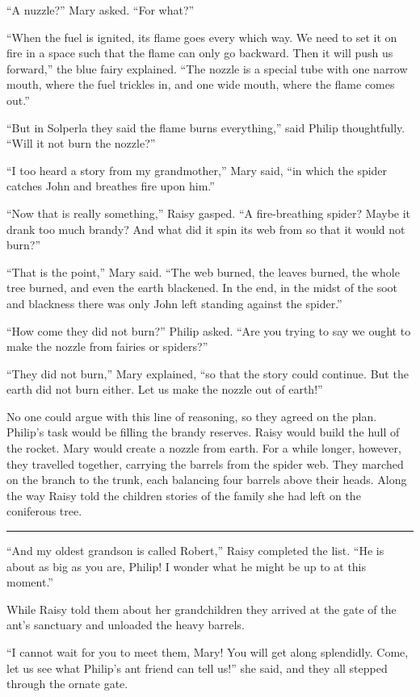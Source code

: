 \documentclass[10pt]{memoir}
\renewcommand{\pfbreakdisplay}{\bigskip \ding{166} \bigskip}
\newcommand{\secbreak}{\fancybreak{\pfbreakdisplay}}
\begin{document}
``A nuzzle?'' Mary asked. ``For what?''

``When the fuel is ignited, its flame goes every which way. We need to set it
on fire in a space such that the flame can only go backward. Then it will push
us forward,'' the blue fairy explained. ``The nozzle is a special tube with one
narrow mouth, where the fuel trickles in, and one wide mouth, where the flame
comes out.''

``But in Solperla they said the flame burns everything,'' said Philip
thoughtfully. ``Will it not burn the nozzle?''

``I too heard a story from my grandmother,'' Mary said, ``in which the spider
catches John and breathes fire upon him.''

``Now that is really something,'' Raisy gasped. ``A fire-breathing spider?
Maybe it drank too much brandy? And what did it spin its web from so that it
would not burn?''

``That is the point,'' Mary said. ``The web burned, the leaves burned, the
whole tree burned, and even the earth blackened. In the end, in the midst of
the soot and blackness there was only John left standing against the spider.''

``How come they did not burn?'' Philip asked. ``Are you trying to say we ought
to make the nozzle from fairies or spiders?''

``They did not burn,'' Mary explained, ``so that the story could continue. But
the earth did not burn either. Let us make the nozzle out of earth!''

No one could argue with this line of reasoning, so they agreed on the plan.
Philip's task would be filling the brandy reserves. Raisy would build the hull
of the rocket. Mary would create a nozzle from earth. For a while longer,
however, they travelled together, carrying the barrels from the spider web.
They marched on the branch to the trunk, each balancing four barrels above
their heads. Along the way Raisy told the children stories of the family she
had left on the coniferous tree.

\secbreak

``And my oldest grandson is called Robert,'' Raisy completed the list. ``He is
about as big as you are, Philip! I wonder what he might be up to at this
moment.''

While Raisy told them about her grandchildren they arrived at the gate of the
ant's sanctuary and unloaded the heavy barrels.

``I cannot wait for you to meet them, Mary! You will get along splendidly.
Come, let us see what Philip's ant friend can tell us!'' she said, and they all
stepped through the ornate gate.
\end{document}
